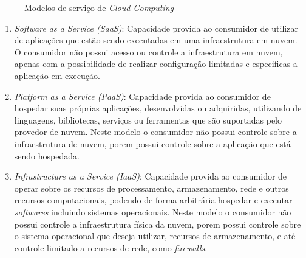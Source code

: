 \begin{figure}[H]
    \caption{Modelos de serviço de \emph{Cloud Computing}}
    \centering
    \label{fig:cloud-computing-services}
\end{figure}

\begin{enumerate}
    \item \emph{Software as a Service (SaaS)}: Capacidade provida ao consumidor
          de utilizar de aplicações que estão sendo executadas em uma infraestrutura
          em nuvem. O consumidor não possui acesso ou controle a infraestrutura em nuvem,
          apenas com a possibilidade de realizar configuração limitadas e especificas
          a aplicação em execução.

    \item \emph{Platform as a Service (PaaS)}: Capacidade provida ao consumidor
          de hospedar suas próprias aplicações, desenvolvidas ou adquiridas, utilizando
          de linguagens, bibliotecas, serviços ou ferramentas que são suportadas pelo
          provedor de nuvem. Neste modelo o consumidor não possui controle sobre a infraestrutura
          de nuvem, porem possui controle sobre a aplicação que está sendo hospedada.

    \item \emph{Infrastructure as a Service (IaaS)}: Capacidade provida ao consumidor
          de operar sobre os recursos de processamento, armazenamento, rede e outros
          recursos computacionais, podendo de forma arbitrária hospedar e executar
          \emph{softwares} incluindo sistemas operacionais. Neste modelo o consumidor
          não possui controle a infraestrutura física da nuvem, porem possui controle
          sobre o sistema operacional que deseja utilizar, recursos de armazenamento,
          e até controle limitado a recursos de rede, como \emph{firewalls}.
\end{enumerate}

